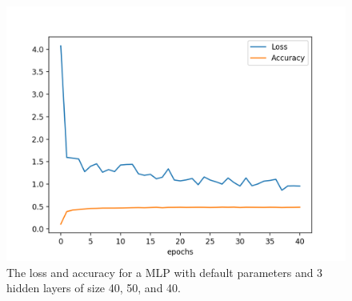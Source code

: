 \documentclass{article}
\begin{document}
\begin{figure}[h!]
    \centering
    \includegraphics[width=1.0\textwidth]{loss_accuracy.png}
    \caption{The loss and accuracy for a MLP with default parameters and 3 hidden layers of size 40, 50, and 40.}
    \label{fig:loss_accuracy}
\end{figure}
\end{document}
